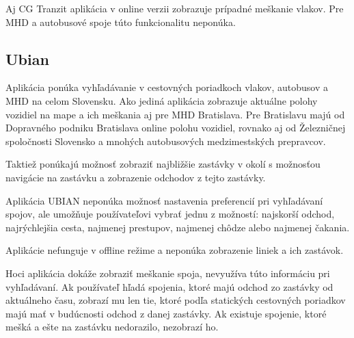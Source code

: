 Aj CG Tranzit aplikácia v online verzii zobrazuje prípadné meškanie vlakov. Pre MHD a autobusové spoje túto funkcionalitu neponúka.

\subsection{Ubian}
Aplikácia ponúka vyhľadávanie v cestovných poriadkoch vlakov, autobusov a MHD na celom Slovensku. Ako jediná aplikácia zobrazuje aktuálne polohy vozidiel na mape a ich meškania aj pre MHD Bratislava. Pre Bratislavu majú od Dopravného podniku Bratislava online polohu vozidiel, rovnako aj od Železničnej spoločnosti Slovensko a mnohých autobusových medzimestských prepravcov.

Taktiež ponúkajú možnosť zobraziť najbližšie zastávky v okolí s možnosťou navigácie na zastávku a zobrazenie odchodov z tejto zastávky. 

Aplikácia UBIAN neponúka možnosť nastavenia preferencií pri vyhľadávaní spojov, ale umožňuje používateľovi vybrať jednu z možností: najskorší odchod, najrýchlejšia cesta, najmenej prestupov, najmenej chôdze alebo najmenej čakania.

Aplikácie nefunguje v offline režime a neponúka zobrazenie liniek a ich zastávok.

Hoci aplikácia dokáže zobraziť meškanie spoja, nevyužíva túto informáciu pri vyhľadávaní. Ak používateľ hľadá spojenia, ktoré majú odchod zo zastávky od aktuálneho času, zobrazí mu len tie, ktoré podľa statických cestovných poriadkov majú mať v budúcnosti odchod z danej zastávky. Ak existuje spojenie, ktoré mešká a ešte na zastávku nedorazilo, nezobrazí ho.



